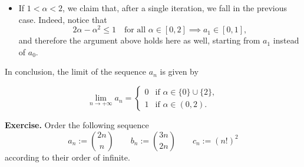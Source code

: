 \documentclass[a4paper,10 pt]{report}
\newcommand{\finalanswer}[1]{%
    \begin{finalAnswer}
    \[
        #1
    \]
    \end{finalAnswer}
}
\theoremstyle{definition}
\begin{document}
\begin{solutionBox}
\begin{itemize}
\item If $1 < \alpha < 2$, we claim that, after a single iteration, we fall in the previous case. Indeed, notice that
\begin{equation*}2 \alpha - \alpha^2 \leq 1 \quad \text{for all $\alpha \in [0,  2]$} \implies a_1 \in [0, 1], \end{equation*}
and therefore the argument above holds here as well, starting from $a_1$ instead of $a_0$.
\end{itemize}

In conclusion, the limit of the sequence $a_n$ is given by
\finalanswer{
 \lim_{n \to + \infty} a_n = \begin{cases} 0 & \text{if $\alpha \in \{0\} \cup \{2\}$}, \\ 1 & \text{if $\alpha \in (0, 2)$}. \end{cases}}
\end{solutionBox}

\begin{exerciseBox} \textbf{Exercise.} Order the following sequence
\begin{equation*}a_n := \binom{2n}{n} \qquad b_n := \binom{3n}{2n} \qquad c_n := (n!)^2\end{equation*}
according to their order of infinite.\end{exerciseBox}
\end{document}
